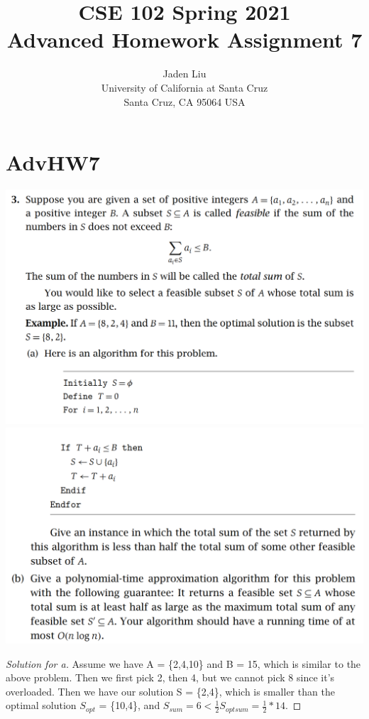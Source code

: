 \documentclass[12pt]{article}
\begin{document}
\title{ CSE 102 Spring 2021\\
	Advanced Homework Assignment 7}

\author{Jaden Liu \\ 
University of California at Santa Cruz\\
Santa Cruz, CA 95064 USA }

\maketitle


\section{AdvHW7} 
\includegraphics[scale=0.25]{adv_10.png}\\
\includegraphics[scale=0.25]{adv_10_2.png}\\
\begin{proof}[Solution for a]
	Assume we have A = \{2,4,10\} and B = 15, which is similar to the above problem. Then we first pick 2, then 4, but we cannot pick 8 since it's overloaded. Then we have our solution S = \{2,4\}, which is smaller than the optimal solution $S_{opt}$ = \{10,4\}, and $S_{sum}=6<\frac{1}{2}S_{optsum}=\frac{1}{2}*14$.
\end{proof}
\end{document}
